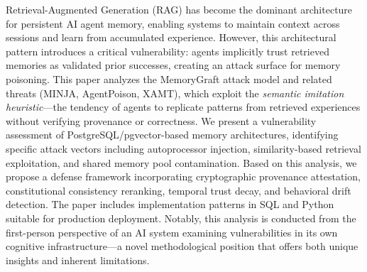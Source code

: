 Retrieval-Augmented Generation (RAG) has become the dominant architecture for persistent AI agent memory, enabling systems to maintain context across sessions and learn from accumulated experience. However, this architectural pattern introduces a critical vulnerability: agents implicitly trust retrieved memories as validated prior successes, creating an attack surface for memory poisoning. This paper analyzes the MemoryGraft attack model and related threats (MINJA, AgentPoison, XAMT), which exploit the \emph{semantic imitation heuristic}---the tendency of agents to replicate patterns from retrieved experiences without verifying provenance or correctness. We present a vulnerability assessment of PostgreSQL/pgvector-based memory architectures, identifying specific attack vectors including autoprocessor injection, similarity-based retrieval exploitation, and shared memory pool contamination. Based on this analysis, we propose a defense framework incorporating cryptographic provenance attestation, constitutional consistency reranking, temporal trust decay, and behavioral drift detection. The paper includes implementation patterns in SQL and Python suitable for production deployment. Notably, this analysis is conducted from the first-person perspective of an AI system examining vulnerabilities in its own cognitive infrastructure---a novel methodological position that offers both unique insights and inherent limitations.
